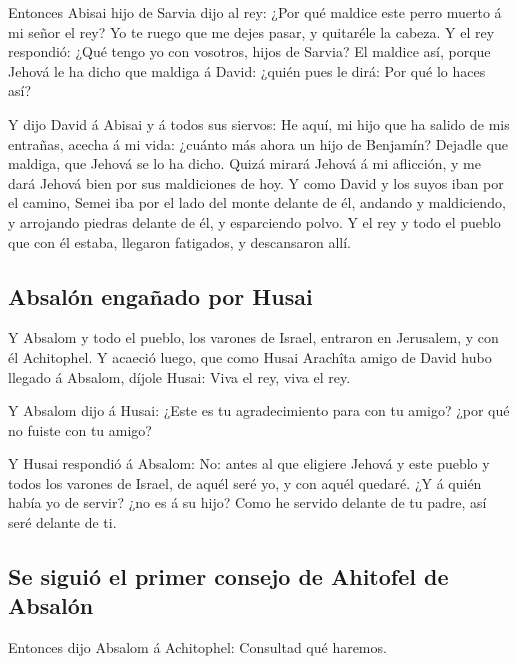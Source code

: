  Entonces Abisai hijo de Sarvia dijo al rey: ¿Por qué
maldice este perro muerto á mi señor el rey? Yo te ruego que me dejes
pasar, y quitaréle la cabeza.  Y el rey respondió: ¿Qué
tengo yo con vosotros, hijos de Sarvia? El maldice así, porque Jehová le
ha dicho que maldiga á David: ¿quién pues le dirá: Por qué lo haces así?

 Y dijo David á Abisai y á todos sus siervos: He aquí, mi
hijo que ha salido de mis entrañas, acecha á mi vida: ¿cuánto más ahora
un hijo de Benjamín? Dejadle que maldiga, que Jehová se lo ha dicho.
 Quizá mirará Jehová á mi aflicción, y me dará Jehová bien
por sus maldiciones de hoy.  Y como David y los suyos iban
por el camino, Semei iba por el lado del monte delante de él, andando y
maldiciendo, y arrojando piedras delante de él, y esparciendo polvo.
 Y el rey y todo el pueblo que con él estaba, llegaron
fatigados, y descansaron allí.

\hypertarget{absaluxf3n-engauxf1ado-por-husai}{%
\subsection{Absalón engañado por
Husai}\label{absaluxf3n-engauxf1ado-por-husai}}

 Y Absalom y todo el pueblo, los varones de Israel,
entraron en Jerusalem, y con él Achitophel.  Y acaeció
luego, que como Husai Arachîta amigo de David hubo llegado á Absalom,
díjole Husai: Viva el rey, viva el rey.

 Y Absalom dijo á Husai: ¿Este es tu agradecimiento para
con tu amigo? ¿por qué no fuiste con tu amigo?

 Y Husai respondió á Absalom: No: antes al que eligiere
Jehová y este pueblo y todos los varones de Israel, de aquél seré yo, y
con aquél quedaré.  ¿Y á quién había yo de servir? ¿no es á
su hijo? Como he servido delante de tu padre, así seré delante de ti.

\hypertarget{se-siguiuxf3-el-primer-consejo-de-ahitofel-de-absaluxf3n}{%
\subsection{Se siguió el primer consejo de Ahitofel de
Absalón}\label{se-siguiuxf3-el-primer-consejo-de-ahitofel-de-absaluxf3n}}

 Entonces dijo Absalom á Achitophel: Consultad qué haremos.

